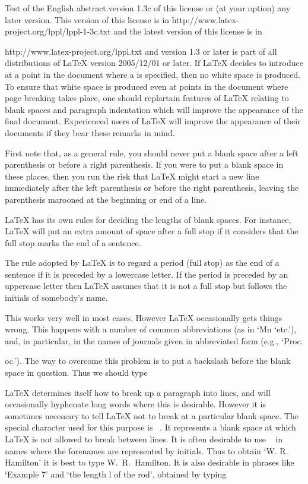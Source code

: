 \begin{eabstract}
	Test of the English abstract.version 1.3c of this license or (at your option) any later
    version. This version of this license is in
       http://www.latex-project.org/lppl/lppl-1-3c.txt
    and the latest version of this license is in
       
       http://www.latex-project.org/lppl.txt
    and version 1.3 or later is part of all distributions of
    LaTeX version 2005/12/01 or later.
    If LaTeX decides to introduce at a point in the document where a  is specified, then no white space is produced. To ensure that white space is produced even at points in the document where page breaking takes place, one should replartain features of LaTeX relating to blank spaces and paragraph indentation which will improve the appearance of the final document. Experienced users of LaTeX will improve the appearance of their documents if they bear these remarks in mind.

First note that, as a general rule, you should never put a blank space after a left parenthesis or before a right parenthesis. If you were to put a blank space in these places, then you run the risk that LaTeX might start a new line immediately after the left parenthesis or before the right parenthesis, leaving the parenthesis marooned at the beginning or end of a line.

LaTeX has its own rules for deciding the lengths of blank spaces. For instance, LaTeX will put an extra amount of space after a full stop if it considers that the full stop marks the end of a sentence.

The rule adopted by LaTeX is to regard a period (full stop) as the end of a sentence if it is preceded by a lowercase letter. If the period is preceded by an uppercase letter then LaTeX assumes that it is not a full stop but follows the initials of somebody's name.

This works very well in most cases. However LaTeX occasionally gets things wrong. This happens with a number of common abbreviations (as in `Mn `etc.'), and, in particular, in the names of journals given in abbreviated form (e.g., `Proc.

oc.'). The way to overcome this problem is to put a backslash before the blank space in question. Thus we should type


LaTeX determines itself how to break up a paragraph into lines, and will occasionally hyphenate long words where this is desirable. However it is sometimes necessary to tell LaTeX not to break at a particular blank space. The special character used for this purpose is ~. It represents a blank space at which LaTeX is not allowed to break between lines. It is often desirable to use ~ in names where the forenames are represented by initials. Thus to obtain `W. R. Hamilton' it is best to type W.~R.~Hamilton. It is also desirable in phrases like `Example 7' and `the length l of the rod', obtained by typing


\end{eabstract}

